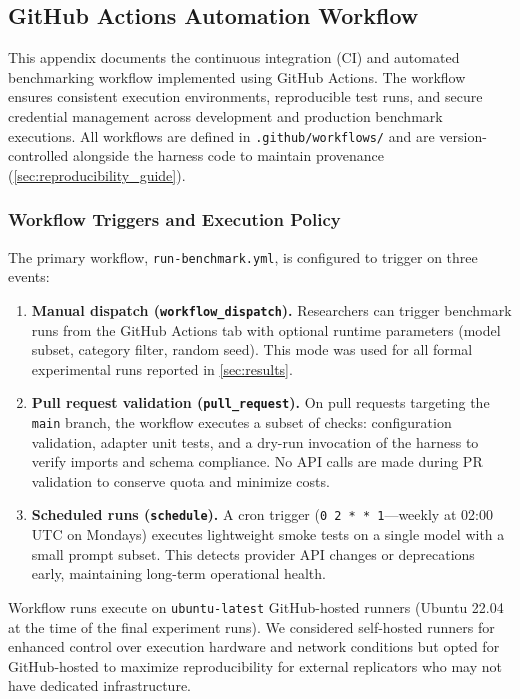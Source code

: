 \subsection{GitHub Actions Automation Workflow}\label{app:github_actions_workflow}

This appendix documents the continuous integration (CI) and automated benchmarking workflow implemented using GitHub Actions. The workflow ensures consistent execution environments, reproducible test runs, and secure credential management across development and production benchmark executions. All workflows are defined in \texttt{.github/workflows/} and are version-controlled alongside the harness code to maintain provenance (\cref{sec:reproducibility_guide}).

\subsubsection{Workflow Triggers and Execution Policy}

The primary workflow, \texttt{run-benchmark.yml}, is configured to trigger on three events:

\begin{enumerate}
\item \textbf{Manual dispatch (\texttt{workflow\_dispatch}).} Researchers can trigger benchmark runs from the GitHub Actions tab with optional runtime parameters (model subset, category filter, random seed). This mode was used for all formal experimental runs reported in \cref{sec:results}.
\item \textbf{Pull request validation (\texttt{pull\_request}).} On pull requests targeting the \texttt{main} branch, the workflow executes a subset of checks: configuration validation, adapter unit tests, and a dry-run invocation of the harness to verify imports and schema compliance. No API calls are made during PR validation to conserve quota and minimize costs.
\item \textbf{Scheduled runs (\texttt{schedule}).} A cron trigger (\texttt{0 2 * * 1}—weekly at 02:00 UTC on Mondays) executes lightweight smoke tests on a single model with a small prompt subset. This detects provider API changes or deprecations early, maintaining long-term operational health.
\end{enumerate}

Workflow runs execute on \texttt{ubuntu-latest} GitHub-hosted runners (Ubuntu 22.04 at the time of the final experiment runs). We considered self-hosted runners for enhanced control over execution hardware and network conditions but opted for GitHub-hosted to maximize reproducibility for external replicators who may not have dedicated infrastructure.

